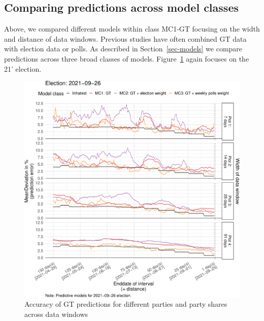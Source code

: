 \documentclass[
  letterpaper,
  DIV=11,
  numbers=noendperiod]{scrartcl}
\begin{document}
\hypertarget{comparing-predictions-across-model-classes}{%
\subsection{Comparing predictions across model
classes}\label{comparing-predictions-across-model-classes}}

Above, we compared different models within class MC1-GT focusing on the
width and distance of data windows. Previous studies have often combined
GT data with election data or polls. As described in
Section~\ref{sec-models} we compare predictions across three broad
classes of models. Figure~\ref{fig-5} again focuses on the 21' election.

\begin{figure}[H]

\caption{\label{fig-5}Accuracy of GT predictions for different parties
and party shares across data windows}

{\centering \includegraphics{figures/fig-5-1.pdf}

}

\end{figure}
\end{document}
